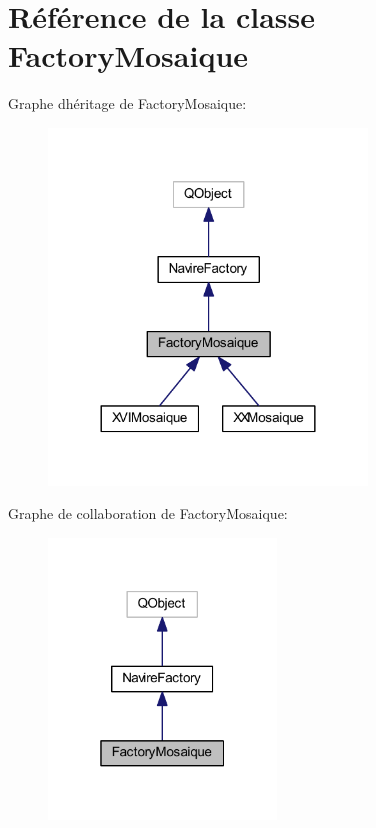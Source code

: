 \hypertarget{class_factory_mosaique}{}\section{Référence de la classe Factory\+Mosaique}
\label{class_factory_mosaique}


Graphe d\textquotesingle{}héritage de Factory\+Mosaique\+:
\nopagebreak
\begin{figure}[H]
\begin{center}
\leavevmode
\includegraphics[width=240pt]{class_factory_mosaique__inherit__graph}
\end{center}
\end{figure}


Graphe de collaboration de Factory\+Mosaique\+:
\nopagebreak
\begin{figure}[H]
\begin{center}
\leavevmode
\includegraphics[width=172pt]{class_factory_mosaique__coll__graph}
\end{center}
\end{figure}

